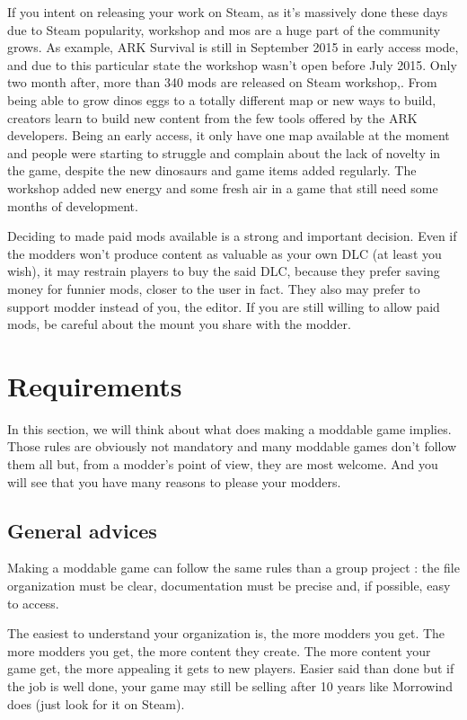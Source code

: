 \documentclass[a4paper,12pt]{article}
\begin{document}
If you intent on releasing your work on Steam, as it's massively done these days due to Steam popularity, workshop and mos are a huge part of the community grows. As example, ARK Survival is still in September 2015 in early access mode, and due to this particular state the workshop wasn't open before July 2015. Only two month after, more than 340 mods are released on Steam workshop,. From being able to grow dinos eggs to a totally different map or new ways to build, creators learn to build new content from the few tools offered by the ARK developers. Being an early access, it only have one map available at the moment and people were starting to struggle and complain about the lack of novelty in the game, despite the new dinosaurs and game items added regularly.
The workshop added new energy and some fresh air in a game that still need some months of development.

Deciding to made paid mods available is a strong and important decision. Even if the modders won't produce content as valuable as your own DLC (at least you wish), it may restrain players to buy the said DLC, because they prefer saving money for funnier mods, closer to the user in fact. They also may prefer to support modder instead of you, the editor. If you are still willing to allow paid mods, be careful about the mount you share with the modder.

\newpage
\section{Requirements}

In this section, we will think about what does making a moddable game implies. Those rules are obviously not mandatory and many moddable games don't follow them all but, from a modder's point of view, they are most welcome. And you will see that you have many reasons to please your modders.

\subsection{General advices}
Making a moddable game can follow the same rules than a group project : the file organization must be clear, documentation must be precise and, if possible, easy to access.

The easiest to understand your organization is, the more modders you get. The more modders you get, the more content they create. The more content your game get, the more appealing it gets to new players. Easier said than done but if the job is well done, your game may still be selling after 10 years like Morrowind does (just look for it on Steam).
\end{document}
